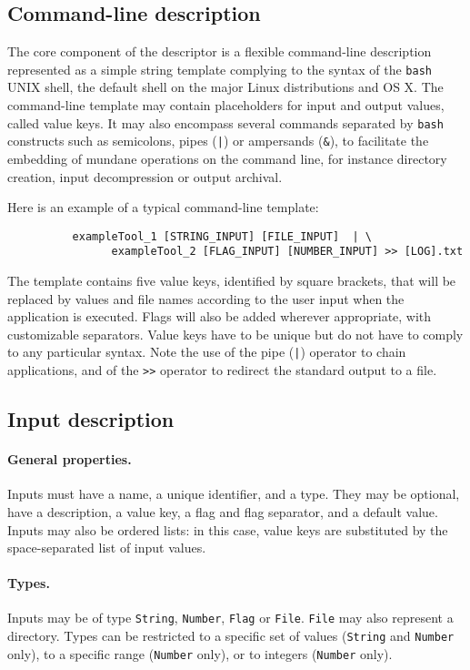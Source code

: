 \documentclass{article}
\begin{document}
\subsection{Command-line description}

The core component of the descriptor is a flexible command-line
description represented as a simple string template complying to the
syntax of the \texttt{bash} UNIX shell, the default shell on the major
Linux distributions and OS X. The command-line template may contain
placeholders for input and output values, called value keys. It may
also encompass several commands separated by \texttt{bash} constructs
such as semicolons, pipes (\texttt{|}) or ampersands (\texttt{\&}), to
facilitate the embedding of mundane operations on the command line,
for instance directory creation, input decompression or output
archival.

Here is an example of a typical command-line template:
\begin{verbatim}
          exampleTool_1 [STRING_INPUT] [FILE_INPUT]  | \
                exampleTool_2 [FLAG_INPUT] [NUMBER_INPUT] >> [LOG].txt
\end{verbatim}
The template contains five value keys, identified by square brackets,
that will be replaced by values and file names according to the user
input when the application is executed. Flags will also be added
wherever appropriate, with customizable separators. Value keys have to
be unique but do not have to comply to any particular syntax. Note the
use of the pipe (\texttt{|}) operator to chain applications, and of
the \texttt{>>} operator to redirect the standard output to a file.

\subsection{Input description}

\paragraph{General properties.} Inputs must have a name, a unique
identifier, and a type. They may be optional, have a description, a
value key, a flag and flag separator, and a default value. Inputs may
also be ordered lists: in this case, value keys are substituted by the
space-separated list of input values.

\paragraph{Types.} Inputs may be of type \texttt{String}, \texttt{Number},
\texttt{Flag} or \texttt{File}. \texttt{File} may also represent a directory.
Types can be restricted to a specific set of values (\texttt{String} 
and \texttt{Number} only), to a specific range (\texttt{Number} only), or to
integers (\texttt{Number} only).
\end{document}
